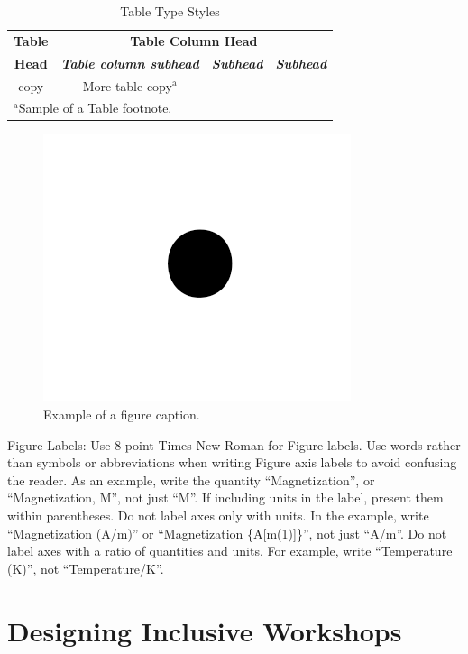 \documentclass[conference]{IEEEtran}
\begin{document}
\begin{table}[htbp]
\caption{Table Type Styles}
\begin{center}
\begin{tabular}{|c|c|c|c|}
\hline
\textbf{Table}&\multicolumn{3}{|c|}{\textbf{Table Column Head}} \\
\cline{2-4} 
\textbf{Head} & \textbf{\textit{Table column subhead}}& \textbf{\textit{Subhead}}& \textbf{\textit{Subhead}} \\
\hline
copy& More table copy$^{\mathrm{a}}$& &  \\
\hline
\multicolumn{4}{l}{$^{\mathrm{a}}$Sample of a Table footnote.}
\end{tabular}
\label{tab1}
\end{center}
\end{table}

\begin{figure}[htbp]
\centerline{\includegraphics{fig1.png}}
\caption{Example of a figure caption.}
\label{fig}
\end{figure}

Figure Labels: Use 8 point Times New Roman for Figure labels. Use words 
rather than symbols or abbreviations when writing Figure axis labels to 
avoid confusing the reader. As an example, write the quantity 
``Magnetization'', or ``Magnetization, M'', not just ``M''. If including 
units in the label, present them within parentheses. Do not label axes only 
with units. In the example, write ``Magnetization (A/m)'' or ``Magnetization 
\{A[m(1)]\}'', not just ``A/m''. Do not label axes with a ratio of 
quantities and units. For example, write ``Temperature (K)'', not 
``Temperature/K''.

\section{Designing Inclusive Workshops}
\lipsum[1]
\end{document}
